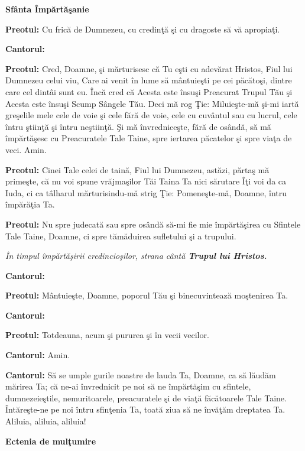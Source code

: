 \documentclass[11pt,letterpaper]{book} \usepackage{ucs}
\newcommand{\mysection}[1]{\begin{center}{\Large \bf #1}\end{center}}
\begin{document}
  \mysection{Sfânta Împărtăşanie}

  {\bf Preotul:} Cu frică de Dumnezeu, cu credinţă şi cu dragoste să
  vă apropiaţi.
  \pagebreak

  {\bf Cantorul:}


  {\bf Preotul:} Cred, Doamne, şi mărturisesc că Tu eşti cu adevărat
  Hristos, Fiul lui Dumnezeu celui viu, Care ai venit în lume să
  mântuieşti pe cei păcătoşi, dintre care cel dintâi sunt eu. Încă
  cred că Acesta este însuşi Preacurat Trupul Tău şi Acesta este
  însuşi Scump Sângele Tău. Deci mă rog Ţie: Miluieşte-mă şi-mi iartă
  greşelile mele cele de voie şi cele fără de voie, cele cu cuvântul
  sau cu lucrul, cele întru ştiinţă şi întru neştiinţă. Şi mă
  învredniceşte, fără de osândă, să mă împărtăşesc cu Preacuratele
  Tale Taine, spre iertarea păcatelor şi spre viaţa de veci. Amin.

  {\bf Preotul:} Cinei Tale celei de taină, Fiul lui Dumnezeu, astăzi,
  părtaş mă primeşte, că nu voi spune vrăjmaşilor Tăi Taina Ta nici
  sărutare Îţi voi da ca Iuda, ci ca tâlharul mărturisindu-mă strig
  Ţie: Pomeneşte-mă, Doamne, întru împărăţia Ta.

  {\bf Preotul:} Nu spre judecată sau spre osândă să-mi fie mie
  împărtăşirea cu Sfintele Tale Taine, Doamne, ci spre tămăduirea
  sufletului şi a trupului.

  {\em În timpul împărtăşirii credincioşilor, strana cântă {\bf Trupul
  lui Hristos.}}

  {\bf Cantorul:}

  \pagebreak

  {\bf Preotul:} Mântuieşte, Doamne, poporul Tău şi binecuvintează
  moştenirea Ta.

  {\bf Cantorul:}


  {\bf Preotul:} Totdeauna, acum şi pururea şi în vecii vecilor.

  {\bf Cantorul:} Amin.

  {\bf Cantorul:} Să se umple gurile noastre de lauda Ta, Doamne, ca
  să lăudăm mărirea Ta; că ne-ai învrednicit pe noi să ne împărtăşim
  cu sfintele, dumnezeieştile, nemuritoarele, preacuratele şi de viaţă
  făcătoarele Tale Taine. Întăreşte-ne pe noi întru sfinţenia Ta,
  toată ziua să ne învăţăm dreptatea Ta. Aliluia, aliluia, aliluia!

  \mysection{Ectenia de mulţumire}
\end{document}
